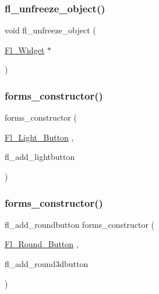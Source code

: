 \mbox{\label{forms_8_h_a5028d11d2b292660ddcf30f00487c1dd}} 
\subsubsection{\texorpdfstring{fl\+\_\+unfreeze\+\_\+object()}{fl\_unfreeze\_object()}}
{\footnotesize\ttfamily void fl\+\_\+unfreeze\+\_\+object (\begin{DoxyParamCaption}\item[{\hyperlink{class_fl___widget}{Fl\+\_\+\+Widget} $\ast$}]{ }\end{DoxyParamCaption})\hspace{0.3cm}{\ttfamily [inline]}}

\mbox{\label{forms_8_h_ad33f83024690ad4d993522afaff77378}} 
\subsubsection{\texorpdfstring{forms\+\_\+constructor()}{forms\_constructor()}\hspace{0.1cm}{\footnotesize\ttfamily [1/10]}}
{\footnotesize\ttfamily forms\+\_\+constructor (\begin{DoxyParamCaption}\item[{\hyperlink{class_fl___light___button}{Fl\+\_\+\+Light\+\_\+\+Button}}]{,  }\item[{fl\+\_\+add\+\_\+lightbutton}]{ }\end{DoxyParamCaption})}

\mbox{\label{forms_8_h_a2b96f57520543da8426ba73dba546cb5}} 
\subsubsection{\texorpdfstring{forms\+\_\+constructor()}{forms\_constructor()}\hspace{0.1cm}{\footnotesize\ttfamily [2/10]}}
{\footnotesize\ttfamily fl\+\_\+add\+\_\+roundbutton forms\+\_\+constructor (\begin{DoxyParamCaption}\item[{\hyperlink{class_fl___round___button}{Fl\+\_\+\+Round\+\_\+\+Button}}]{,  }\item[{fl\+\_\+add\+\_\+round3dbutton}]{ }\end{DoxyParamCaption})}

